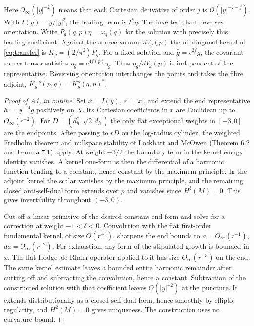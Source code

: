 \documentclass[11pt,letterpaper]{article}
\numberwithin{equation}{section}
\begin{document}
Here \(O_\infty(|y|^{-2})\) means that each Cartesian derivative of
order \(j\) is \(O(|y|^{-2-j})\). With \(I(y)=y/|y|^2\), the leading
term is \(I^*\eta\). The inverted chart reverses orientation.
Write \(P_g(q,p)\eta=\omega_\eta(q)\) for the solution with precisely
this leading coefficient. Against the source volume \(dV_g(p)\) the
off-diagonal kernel of \eqref{eq:transfer} is \(K_g=(2/\pi^2)P_g\).
For a fixed solution and \(\widehat g=e^{2f}g\), the covariant source
tensor satisfies \(\eta_{\widehat g}=e^{4f(p)}\eta_g\).
Thus \(\eta_g/dV_g(p)\) is independent of the representative.
Reversing orientation interchanges the points and takes the fibre adjoint,
\(K_g^{-o}(p,q)=K_g^{o}(q,p)^*\).

\begin{proof}[Proof of A1, in outline]
Set \(x=I(y)\), \(r=|x|\), and extend the end representative
\(h=|y|^{-4}g\) positively on \(X\). Its Cartesian coefficients in
\(x\) are Euclidean up to \(O_\infty(r^{-2})\).
For \(D=(d_h^*,\sqrt2\,d_h^-)\) the only flat exceptional weights in
\([-3,0]\) are the endpoints. After passing to \(rD\) on the log-radius
cylinder, the weighted Fredholm theorem and nullspace stability of
\href{https://www.numdam.org/item/ASNSP_1985_4_12_3_409_0/}
{Lockhart and McOwen (Theorem 6.2 and Lemma 7.1)} apply.
At weight \(-3/2\) the boundary term in the kernel energy identity
vanishes. A kernel one-form is then the differential of a harmonic
function tending to a constant, hence constant by the maximum principle.
In the adjoint kernel the scalar vanishes
by the maximum principle, and the remaining closed anti-self-dual form
extends over \(p\) and vanishes since \(H^2(M)=0\).
This gives invertibility throughout \((-3,0)\).

Cut off a linear primitive of the desired constant end form and solve for
a correction at weight \(-1<\delta<0\). Convolution with the flat
first-order fundamental kernel, of size \(O(r^{-3})\), sharpens the
end bounds to \(a=O_\infty(r^{-1})\), \(da=O_\infty(r^{-2})\).
For exhaustion, any form of the stipulated growth is bounded in \(x\).
The flat Hodge--de Rham operator applied to it has size \(O_\infty(r^{-3})\)
on the end. The same kernel estimate leaves a bounded entire harmonic
remainder after cutting off and subtracting the convolution, hence a
constant. Subtraction of the constructed solution with that coefficient
leaves \(O(|y|^{-2})\) at the puncture. It extends distributionally as
a closed self-dual form, hence smoothly by elliptic regularity, and
\(H^2(M)=0\) gives uniqueness. The construction uses no curvature bound.
\end{proof}
\end{document}
